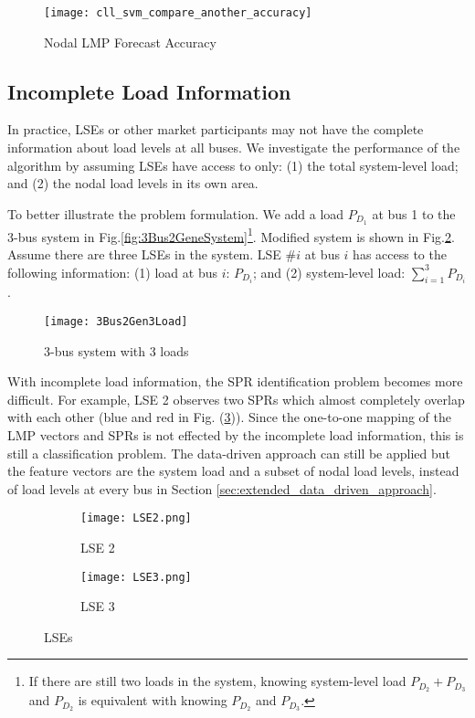 \documentclass[letterpaper, 11pt]{article}
\theoremstyle{plain}
\theoremstyle{definition}
\begin{document}
\begin{figure}[htbp]
  \centering
  \texttt{[image: cll\_svm\_compare\_another\_accuracy]}
  \caption{Nodal LMP Forecast Accuracy}
  \label{fig:svm_cll_nodal_compare}
\end{figure}







\subsection{Incomplete Load Information} \label{sub:partial_load_information}
In practice, LSEs or other market participants may not have the complete information about load levels at all buses. We investigate the performance of the algorithm by assuming LSEs have access to only: (1) the total system-level load; and (2) the nodal load levels in its own area.

To better illustrate the problem formulation. We add a load $P_{D_1}$ at bus 1 to the 3-bus system in Fig.\ref{fig:3Bus2GeneSystem}\footnote{If there are still two loads in the system, knowing system-level load $P_{D_2}+P_{D_3}$ and $P_{D_2}$ is equivalent with knowing $P_{D_2}$ and $P_{D_3}$.}. Modified system is shown in Fig.\ref{fig:3Bus2Gen3Load}. 
Assume there are three LSEs in the system. LSE \#$i$ at bus $i$ has access to the following information: (1) load at bus $i$: $P_{D_i}$; and (2) system-level load: $\sum_{i=1}^3 P_{D_i}$.
\begin{figure}[htbp]
  \centering
  \texttt{[image: 3Bus2Gen3Load]}
  \caption{3-bus system with 3 loads}
  \label{fig:3Bus2Gen3Load}
\end{figure}

With incomplete load information, the SPR identification problem becomes more difficult. 
For example, LSE 2 observes two SPRs which almost completely overlap with each other (blue and red in Fig. (\ref{fig:LSE2_3bus})). 
Since the one-to-one mapping of the LMP vectors and SPRs is not effected by the incomplete load information, this is still a classification problem. The data-driven approach can still be applied but the feature vectors are the system load and a subset of nodal load levels, instead of load levels at every bus in Section \ref{sec:extended_data_driven_approach}.
\begin{figure}[htbp]
  \centering
  \begin{subfigure}[t]{0.49\linewidth}
  \centering
  \texttt{[image: LSE2.png]}
  \caption{LSE 2}
  \label{fig:LSE2_3bus}
  \end{subfigure}
  \begin{subfigure}[t]{0.49\linewidth}
  \centering
  \texttt{[image: LSE3.png]}
  \caption{LSE 3}
  \label{fig:LSE3_3bus}
  \end{subfigure}
  \caption{LSEs}
  \label{fig:LMP_LSE}
\end{figure}
\end{document}
